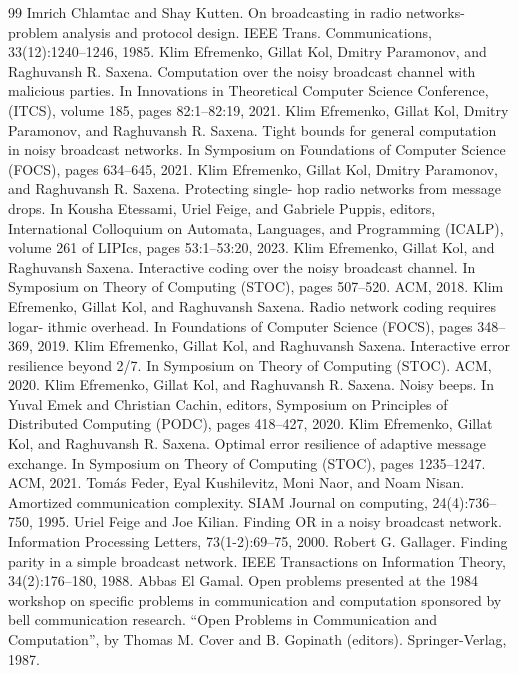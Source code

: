 \documentclass[10pt,a4paper]{article}
\begin{document}
\begin{thebibliography}{99}
 Imrich Chlamtac and Shay Kutten. On broadcasting in radio networks-problem analysis and protocol design. IEEE Trans. Communications, 33(12):1240–1246, 1985.
 Klim Efremenko, Gillat Kol, Dmitry Paramonov, and Raghuvansh R. Saxena. Computation over the noisy broadcast channel with malicious parties. In Innovations in Theoretical Computer Science Conference, (ITCS), volume 185, pages 82:1–82:19, 2021.
 Klim Efremenko, Gillat Kol, Dmitry Paramonov, and Raghuvansh R. Saxena. Tight bounds for general computation in noisy broadcast networks. In Symposium on Foundations of Computer Science (FOCS), pages 634–645, 2021.
 Klim Efremenko, Gillat Kol, Dmitry Paramonov, and Raghuvansh R. Saxena. Protecting single- hop radio networks from message drops. In Kousha Etessami, Uriel Feige, and Gabriele Puppis, editors, International Colloquium on Automata, Languages, and Programming (ICALP), volume 261 of LIPIcs, pages 53:1–53:20, 2023.
 Klim Efremenko, Gillat Kol, and Raghuvansh Saxena. Interactive coding over the noisy broadcast channel. In Symposium on Theory of Computing (STOC), pages 507–520. ACM, 2018.
 Klim Efremenko, Gillat Kol, and Raghuvansh Saxena. Radio network coding requires logar- ithmic overhead. In Foundations of Computer Science (FOCS), pages 348–369, 2019.
 Klim Efremenko, Gillat Kol, and Raghuvansh Saxena. Interactive error resilience beyond 2/7. In Symposium on Theory of Computing (STOC). ACM, 2020.
 Klim Efremenko, Gillat Kol, and Raghuvansh R. Saxena. Noisy beeps. In Yuval Emek and Christian Cachin, editors, Symposium on Principles of Distributed Computing (PODC), pages 418–427, 2020.
 Klim Efremenko, Gillat Kol, and Raghuvansh R. Saxena. Optimal error resilience of adaptive message exchange. In Symposium on Theory of Computing (STOC), pages 1235–1247. ACM, 2021.
 Tomás Feder, Eyal Kushilevitz, Moni Naor, and Noam Nisan. Amortized communication complexity. SIAM Journal on computing, 24(4):736–750, 1995.
 Uriel Feige and Joe Kilian. Finding OR in a noisy broadcast network. Information Processing Letters, 73(1-2):69–75, 2000.
 Robert G. Gallager. Finding parity in a simple broadcast network. IEEE Transactions on Information Theory, 34(2):176–180, 1988.
 Abbas El Gamal. Open problems presented at the 1984 workshop on specific problems in communication and computation sponsored by bell communication research. “Open Problems in Communication and Computation”, by Thomas M. Cover and B. Gopinath (editors). Springer-Verlag, 1987.

\end{thebibliography}
\end{document}
